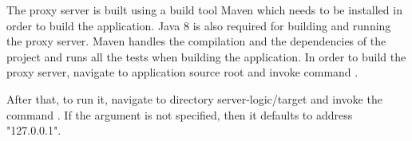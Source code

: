 \documentclass[..thesis.tex]{subfiles}
\begin{document}
The proxy server is built using a build tool Maven which needs to be installed in order to build the application.
Java 8 is also required for building and running the proxy server.
Maven handles the compilation and the dependencies of the project and runs all the tests when building the application.
In order to build the proxy server, navigate to application source root and invoke command .

\begin{sloppypar}
  After that, to run it, navigate to directory server-logic/target and invoke the command
  .
  If the  argument is not specified, then it defaults to address "127.0.0.1".
\end{sloppypar}
\end{document}

